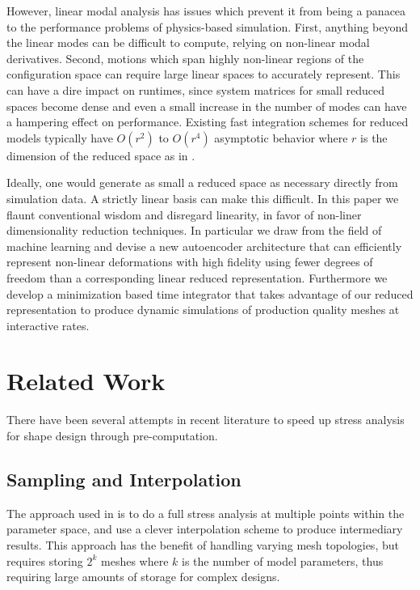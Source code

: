 \documentclass[sigconf, authorversion, review]{acmart}
\begin{document}
However, linear modal analysis has issues which prevent it from being a panacea to the performance problems of physics-based simulation. First, anything beyond the linear modes can be difficult to compute, relying on non-linear modal derivatives. Second, motions which span highly non-linear regions of the configuration space can require large linear spaces to accurately represent. This can have a dire impact on runtimes, since system matrices for small reduced spaces become dense and even a small increase in the number of modes can have a hampering effect on performance. Existing fast integration schemes for reduced models typically have $O(r^2)$ to $O(r^4)$ asymptotic behavior where $r$ is the dimension of the reduced space as in \cite{Barbic-05} .

Ideally, one would generate as small a reduced space as necessary directly from simulation data. A strictly linear basis can make this difficult. In this paper we flaunt conventional wisdom and disregard linearity, in favor of non-liner dimensionality reduction techniques. In particular we draw from the field of machine learning and devise a new autoencoder architecture that can efficiently represent non-linear deformations with high fidelity using fewer degrees of freedom than a corresponding linear reduced representation. Furthermore we develop a minimization based time integrator that takes advantage of our reduced representation to produce dynamic simulations of production quality meshes at interactive rates.



\section{Related Work}\label{sec:related}


There have been several attempts in recent literature to speed up stress analysis for shape design through pre-computation.
\subsection{Sampling and Interpolation}

The approach used in \cite{Schulz-17} is to do a full stress analysis at multiple points within the parameter space, and use a clever interpolation scheme to produce intermediary results. This approach has the benefit of handling varying mesh topologies, but requires storing $2^k$ meshes where $k$ is the number of model parameters, thus requiring large amounts of storage for complex designs.
\end{document}
